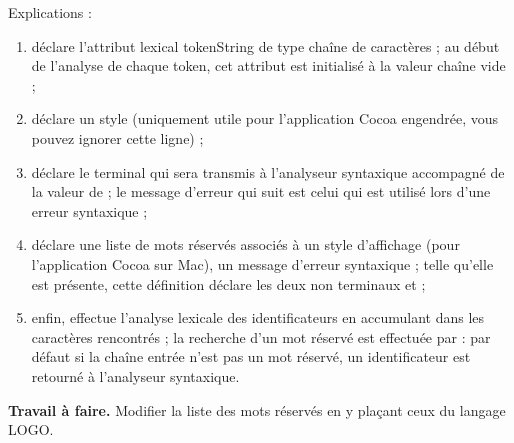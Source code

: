 
Explications :
\begin{enumerate}
  \item {} déclare l’attribut lexical tokenString de type chaîne de caractères ; au début de l’analyse de chaque token, cet attribut est initialisé à la valeur chaîne vide ;
  \item {} déclare un style (uniquement utile pour l’application Cocoa engendrée, vous pouvez ignorer cette ligne) ;
  \item {} déclare le terminal  qui sera transmis à l’analyseur syntaxique accompagné de la valeur de  ; le message d’erreur qui suit est celui qui est utilisé lors d’une erreur syntaxique ;
  \item {} déclare une liste de mots réservés associés à un style d’affichage (pour l’application Cocoa sur Mac), un message d’erreur syntaxique ; telle qu’elle est présente, cette définition déclare les deux non terminaux  et  ;
  \item enfin,  effectue l’analyse lexicale des identificateurs en accumulant dans  les caractères rencontrés ; la recherche d'un mot réservé est effectuée par : par défaut si la chaîne entrée n'est pas un mot réservé, un identificateur est retourné à l’analyseur syntaxique.
\end{enumerate}

\textbf{Travail à faire.} Modifier la liste des mots réservés en y plaçant ceux du langage LOGO.

